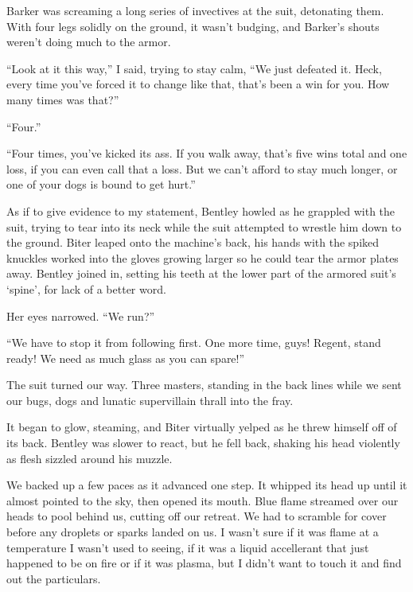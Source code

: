 Barker was screaming a long series of invectives at the suit, detonating them.  With four legs solidly on the ground, it wasn't budging, and Barker's shouts weren't doing much to the armor.



``Look at it this way,'' I said, trying to stay calm,  ``We just defeated it.  Heck, every time you've forced it to change like that, that's been a win for you.  How many times was that?''



``Four.''



``Four times, you've kicked its ass.  If you walk away, that's five wins total and one loss, if you can even call that a loss.  But we can't afford to stay much longer, or one of your dogs is bound to get hurt.''



As if to give evidence to my statement, Bentley howled as he grappled with the suit, trying to tear into its neck while the suit attempted to wrestle him down to the ground.  Biter leaped onto the machine's back, his hands with the spiked knuckles worked into the gloves growing larger so he could tear the armor plates away.  Bentley joined in, setting his teeth at the lower part of the armored suit's `spine', for lack of a better word.



Her eyes narrowed.  ``We run?''



``We have to stop it from following first.  One more time, guys!  Regent, stand ready!  We need as much glass as you can spare!''



The suit turned our way.  Three masters, standing in the back lines while we sent our bugs, dogs and lunatic supervillain thrall into the fray.



It began to glow, steaming, and Biter virtually yelped as he threw himself off of its back.  Bentley was slower to react, but he fell back, shaking his head violently as flesh sizzled around his muzzle.



We backed up a few paces as it advanced one step.  It whipped its head up until it almost pointed to the sky, then opened its mouth.  Blue flame streamed over our heads to pool behind us, cutting off our retreat.  We had to scramble for cover before any droplets or sparks landed on us.  I wasn't sure if it was flame at a temperature I wasn't used to seeing, if it was a liquid accellerant that just happened to be on fire or if it was plasma, but I didn't want to touch it and find out the particulars.



